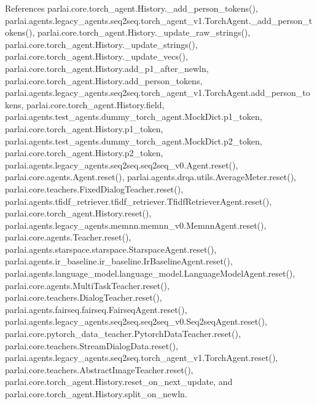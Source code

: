 References parlai.\+core.\+torch\+\_\+agent.\+History.\+\_\+add\+\_\+person\+\_\+tokens(), parlai.\+agents.\+legacy\+\_\+agents.\+seq2seq.\+torch\+\_\+agent\+\_\+v1.\+Torch\+Agent.\+\_\+add\+\_\+person\+\_\+tokens(), parlai.\+core.\+torch\+\_\+agent.\+History.\+\_\+update\+\_\+raw\+\_\+strings(), parlai.\+core.\+torch\+\_\+agent.\+History.\+\_\+update\+\_\+strings(), parlai.\+core.\+torch\+\_\+agent.\+History.\+\_\+update\+\_\+vecs(), parlai.\+core.\+torch\+\_\+agent.\+History.\+add\+\_\+p1\+\_\+after\+\_\+newln, parlai.\+core.\+torch\+\_\+agent.\+History.\+add\+\_\+person\+\_\+tokens, parlai.\+agents.\+legacy\+\_\+agents.\+seq2seq.\+torch\+\_\+agent\+\_\+v1.\+Torch\+Agent.\+add\+\_\+person\+\_\+tokens, parlai.\+core.\+torch\+\_\+agent.\+History.\+field, parlai.\+agents.\+test\+\_\+agents.\+dummy\+\_\+torch\+\_\+agent.\+Mock\+Dict.\+p1\+\_\+token, parlai.\+core.\+torch\+\_\+agent.\+History.\+p1\+\_\+token, parlai.\+agents.\+test\+\_\+agents.\+dummy\+\_\+torch\+\_\+agent.\+Mock\+Dict.\+p2\+\_\+token, parlai.\+core.\+torch\+\_\+agent.\+History.\+p2\+\_\+token, parlai.\+agents.\+legacy\+\_\+agents.\+seq2seq.\+seq2seq\+\_\+v0.\+Agent.\+reset(), parlai.\+core.\+agents.\+Agent.\+reset(), parlai.\+agents.\+drqa.\+utils.\+Average\+Meter.\+reset(), parlai.\+core.\+teachers.\+Fixed\+Dialog\+Teacher.\+reset(), parlai.\+agents.\+tfidf\+\_\+retriever.\+tfidf\+\_\+retriever.\+Tfidf\+Retriever\+Agent.\+reset(), parlai.\+core.\+torch\+\_\+agent.\+History.\+reset(), parlai.\+agents.\+legacy\+\_\+agents.\+memnn.\+memnn\+\_\+v0.\+Memnn\+Agent.\+reset(), parlai.\+core.\+agents.\+Teacher.\+reset(), parlai.\+agents.\+starspace.\+starspace.\+Starspace\+Agent.\+reset(), parlai.\+agents.\+ir\+\_\+baseline.\+ir\+\_\+baseline.\+Ir\+Baseline\+Agent.\+reset(), parlai.\+agents.\+language\+\_\+model.\+language\+\_\+model.\+Language\+Model\+Agent.\+reset(), parlai.\+core.\+agents.\+Multi\+Task\+Teacher.\+reset(), parlai.\+core.\+teachers.\+Dialog\+Teacher.\+reset(), parlai.\+agents.\+fairseq.\+fairseq.\+Fairseq\+Agent.\+reset(), parlai.\+agents.\+legacy\+\_\+agents.\+seq2seq.\+seq2seq\+\_\+v0.\+Seq2seq\+Agent.\+reset(), parlai.\+core.\+pytorch\+\_\+data\+\_\+teacher.\+Pytorch\+Data\+Teacher.\+reset(), parlai.\+core.\+teachers.\+Stream\+Dialog\+Data.\+reset(), parlai.\+agents.\+legacy\+\_\+agents.\+seq2seq.\+torch\+\_\+agent\+\_\+v1.\+Torch\+Agent.\+reset(), parlai.\+core.\+teachers.\+Abstract\+Image\+Teacher.\+reset(), parlai.\+core.\+torch\+\_\+agent.\+History.\+reset\+\_\+on\+\_\+next\+\_\+update, and parlai.\+core.\+torch\+\_\+agent.\+History.\+split\+\_\+on\+\_\+newln.

